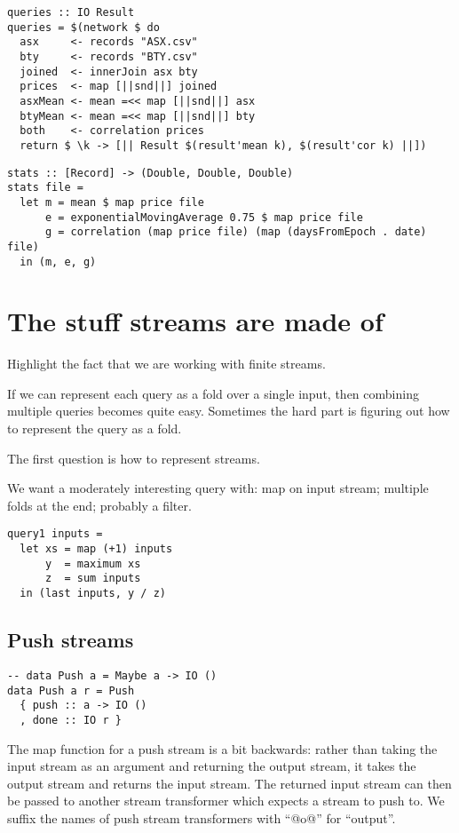 \begin{lstlisting}
queries :: IO Result
queries = $(network $ do
  asx     <- records "ASX.csv"
  bty     <- records "BTY.csv"
  joined  <- innerJoin asx bty
  prices  <- map [||snd||] joined
  asxMean <- mean =<< map [||snd||] asx
  btyMean <- mean =<< map [||snd||] bty
  both    <- correlation prices
  return $ \k -> [|| Result $(result'mean k), $(result'cor k) ||])
\end{lstlisting}


\begin{lstlisting}
stats :: [Record] -> (Double, Double, Double)
stats file =
  let m = mean $ map price file
      e = exponentialMovingAverage 0.75 $ map price file
      g = correlation (map price file) (map (daysFromEpoch . date) file)
  in (m, e, g)
\end{lstlisting}

\section{The stuff streams are made of}

Highlight the fact that we are working with finite streams.

If we can represent each query as a fold over a single input, then combining multiple queries becomes quite easy.
Sometimes the hard part is figuring out how to represent the query as a fold.

The first question is how to represent streams.

We want a moderately interesting query with: map on input stream; multiple folds at the end; probably a filter.

\begin{lstlisting}
query1 inputs =
  let xs = map (+1) inputs
      y  = maximum xs
      z  = sum inputs
  in (last inputs, y / z)
\end{lstlisting}

\subsection{Push streams}


\begin{lstlisting}
-- data Push a = Maybe a -> IO ()
data Push a r = Push
  { push :: a -> IO ()
  , done :: IO r }
\end{lstlisting}

The map function for a push stream is a bit backwards: rather than taking the input stream as an argument and returning the output stream, it takes the output stream and returns the input stream.
The returned input stream can then be passed to another stream transformer which expects a stream to push to.
We suffix the names of push stream transformers with ``@o@'' for ``output''.

